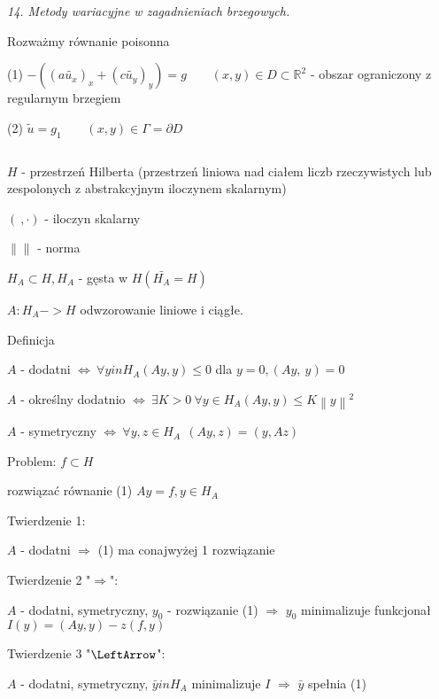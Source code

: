 \textit{14. Metody wariacyjne w zagadnieniach brzegowych.}

Rozważmy równanie poisonna

(1) $-((a\tilde{u_x})_x + (c\tilde{u_y})_y) = g\ \ \ \ \ \ \ \ \ (x,y) \in D \subset \mathbb{R}^2$ - obszar ograniczony z regularnym brzegiem

(2) $\tilde{u} = g_1\ \ \ \ \ \ \ \ \ (x,y) \in \Gamma = \partial D$

$\ $

$H$ - przestrzeń Hilberta (przestrzeń liniowa nad ciałem liczb rzeczywistych lub zespolonych z abstrakcyjnym iloczynem skalarnym)

$(\ ,\cdot)$ - iloczyn skalarny

$\left \|  \right \|$ - norma

$H_A \subset H, H_A$ - gęsta w $H (\bar{H_A} = H)$

$A: H_A -> H$ odwzorowanie liniowe i ciągłe.

Definicja

$A$ - dodatni $\Leftrightarrow\ \forall y in H_A (Ay,y) \leqslant 0$    dla $y = 0, (Ay,\ y) = 0$

$A$ - określny dodatnio $\Leftrightarrow\ \exists K > 0\ \forall y \in H_A (Ay,y) \leqslant K \left \| y \right \| ^ 2$

$A$ - symetryczny $\Leftrightarrow\ \forall y,z \in H_A\ \ (Ay,z) = (y,Az)$

Problem: $f \subset H$

    rozwiązać równanie (1) $Ay=f, y \in H_A$
    
Twierdzenie 1:

$A$ - dodatni $\Rightarrow$ (1) ma conajwyżej 1 rozwiązanie

Twierdzenie 2 "$\Rightarrow$":

$A$ - dodatni, symetryczny, $y_0$ - rozwiązanie (1) $\Rightarrow$ $y_0$ minimalizuje funkcjonał $I(y) = (Ay,y) - z(f,y)$

Twierdzenie 3 "$\LeftArrow$":

$A$ - dodatni, symetryczny, $\bar{y} in H_A$ minimalizuje $I$ $\Rightarrow$ $\bar{y}$ spełnia (1)